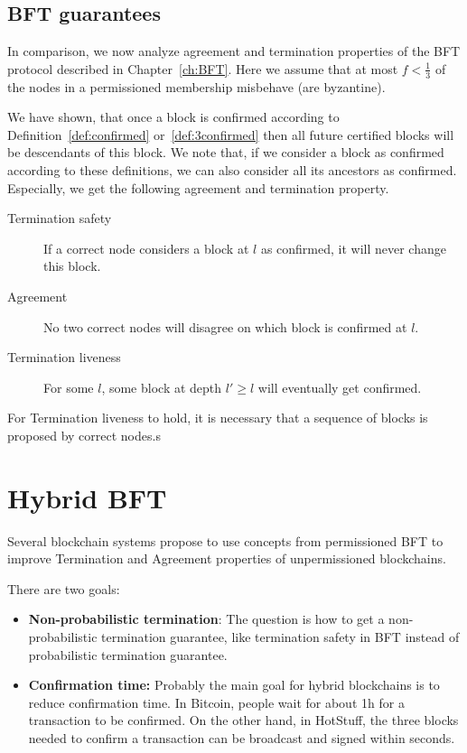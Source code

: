 \subsection{BFT guarantees}
In comparison, we now analyze agreement and termination properties of the BFT protocol described in Chapter~\ref{ch:BFT}. 
Here we assume that at most $f<\frac{1}{3}$ of the nodes in a permissioned membership misbehave (are byzantine).

We have shown, that once a block is confirmed according to Definition~\ref{def:confirmed} or~\ref{def:3confirmed} then all future certified blocks will be descendants of this block. We note that, if we consider a block as confirmed according to these definitions, we can also consider all its ancestors as confirmed. Especially, we get the following agreement and termination property.

\begin{description}
	\item[Termination safety] If a correct node considers a block at \depth $l$ as confirmed, it will never change this block.
	\item[Agreement] No two correct nodes will disagree on which block is confirmed at \depth $l$.
	\item[Termination liveness] For some \depth $l$, some block at depth $l'\geq l$ will eventually get confirmed.
\end{description}

For Termination liveness to hold, it is necessary that a sequence of blocks is proposed by correct nodes.s

\section{Hybrid BFT}
Several blockchain systems propose to use concepts from permissioned BFT to improve Termination and Agreement properties of unpermissioned blockchains. 

There are two goals:
\begin{itemize}
	\item \textbf{Non-probabilistic termination}: The question is how to get a non-probabilistic termination guarantee, like termination safety in BFT instead of probabilistic termination guarantee.
	\item \textbf{Confirmation time:} Probably the main goal for hybrid blockchains is to reduce confirmation time. In Bitcoin, people wait for about 1h for a transaction to be confirmed. On the other hand, in HotStuff, the three blocks needed to confirm a transaction can be broadcast and signed within seconds.
\end{itemize}

